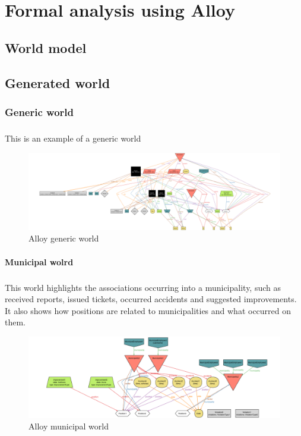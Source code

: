 \chapter{Formal analysis using Alloy}
		\section{World model}
			
		\section{Generated world}
			\subsection{Generic world}
				\paragraph{}
					This is an example of a generic world
					\begin{figure}[!h]
						\includegraphics[width=\textwidth]{images/Alloy/GenericWorld.png}
						\caption{Alloy generic world}
					\end{figure}
			\subsubsection{Municipal wolrd}
				\paragraph{}
					This world highlights the associations occurring into a municipality, such as received reports, issued tickets, occurred accidents and suggested improvements. It also shows how positions are related to municipalities and what occurred on them.
					\begin{figure}[!h]
						\includegraphics[width=\textwidth]{images/Alloy/MunicipalWorld.png}
						\caption{Alloy municipal world}
					\end{figure}
